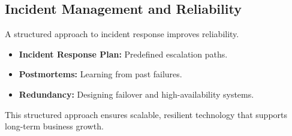 \subsection{Incident Management and Reliability}

A structured approach to incident response improves reliability.

\begin{itemize}
    \item \textbf{Incident Response Plan:} Predefined escalation paths.
    \item \textbf{Postmortems:} Learning from past failures.
    \item \textbf{Redundancy:} Designing failover and high-availability systems.
\end{itemize}

This structured approach ensures scalable, resilient technology that supports long-term business growth.
